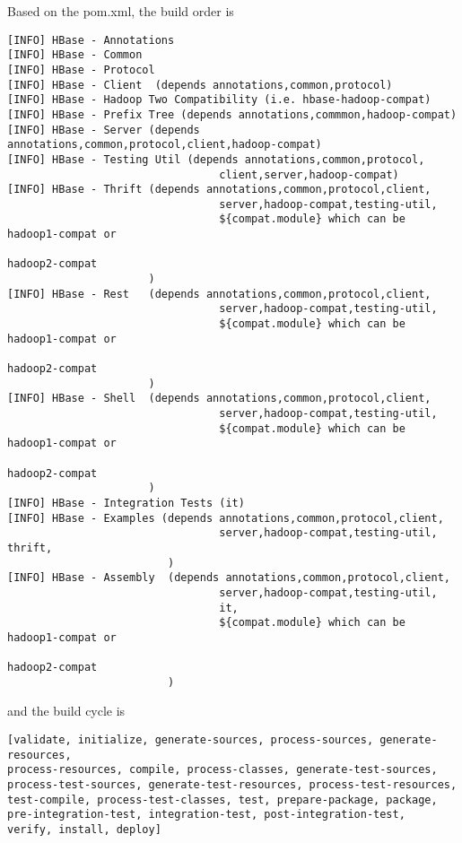 Based on the pom.xml, the build order is
\begin{verbatim}
[INFO] HBase - Annotations
[INFO] HBase - Common
[INFO] HBase - Protocol
[INFO] HBase - Client  (depends annotations,common,protocol)
[INFO] HBase - Hadoop Two Compatibility (i.e. hbase-hadoop-compat)
[INFO] HBase - Prefix Tree (depends annotations,commmon,hadoop-compat)
[INFO] HBase - Server (depends annotations,common,protocol,client,hadoop-compat) 
[INFO] HBase - Testing Util (depends annotations,common,protocol,
                                 client,server,hadoop-compat)
[INFO] HBase - Thrift (depends annotations,common,protocol,client,
                                 server,hadoop-compat,testing-util,
                                 ${compat.module} which can be hadoop1-compat or
                                                               hadoop2-compat
                      )
[INFO] HBase - Rest   (depends annotations,common,protocol,client,
                                 server,hadoop-compat,testing-util,
                                 ${compat.module} which can be hadoop1-compat or
                                                               hadoop2-compat
                      )
[INFO] HBase - Shell  (depends annotations,common,protocol,client,
                                 server,hadoop-compat,testing-util,
                                 ${compat.module} which can be hadoop1-compat or
                                                               hadoop2-compat
                      )
[INFO] HBase - Integration Tests (it)
[INFO] HBase - Examples (depends annotations,common,protocol,client,
                                 server,hadoop-compat,testing-util, thrift,
                         )
[INFO] HBase - Assembly  (depends annotations,common,protocol,client,
                                 server,hadoop-compat,testing-util,
                                 it,
                                 ${compat.module} which can be hadoop1-compat or
                                                               hadoop2-compat
                         )
\end{verbatim}
and the build cycle is
\begin{verbatim}
[validate, initialize, generate-sources, process-sources, generate-resources,
process-resources, compile, process-classes, generate-test-sources, 
process-test-sources, generate-test-resources, process-test-resources, 
test-compile, process-test-classes, test, prepare-package, package, 
pre-integration-test, integration-test, post-integration-test, 
verify, install, deploy]
\end{verbatim}
